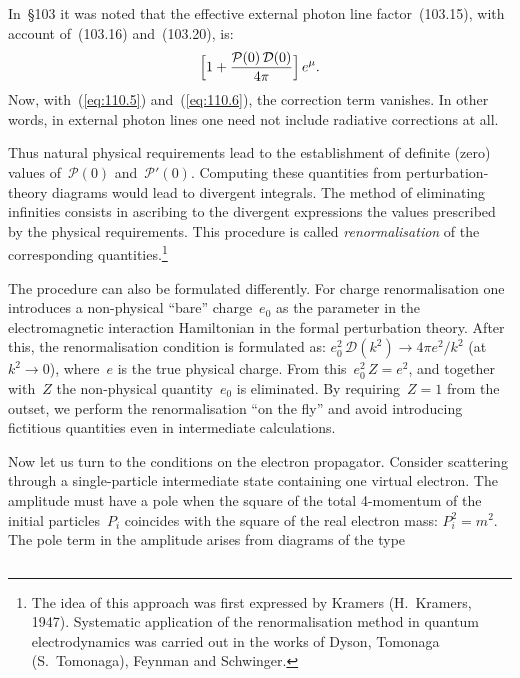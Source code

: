 In~\S103 it was noted that the effective external photon line factor~(103.15), with account of~(103.16) and~(103.20), is:
\[
\Bigl[1 + \frac{\mathcal{P}(0)\,\mathcal{D}(0)}{4\pi}\Bigr]\,e^\mu.
\]
Now, with~(\ref{eq:110.5}) and~(\ref{eq:110.6}), the correction term vanishes. In other words, in external photon lines one need not include radiative corrections at all.

Thus natural physical requirements lead to the establishment of definite (zero) values of~$\mathcal{P}(0)$ and~$\mathcal{P}'(0)$. Computing these quantities from perturbation-theory diagrams would lead to divergent integrals. The method of eliminating infinities consists in ascribing to the divergent expressions the values prescribed by the physical requirements. This procedure is called \emph{renormalisation} of the corresponding quantities.\footnote{The idea of this approach was first expressed by Kramers (H.~Kramers, 1947). Systematic application of the renormalisation method in quantum electrodynamics was carried out in the works of Dyson, Tomonaga (S.~Tomonaga), Feynman and Schwinger.}


The procedure can also be formulated differently. For charge renormalisation one introduces a non-physical ``bare'' charge~$e_0$ as the parameter in the electromagnetic interaction Hamiltonian in the formal perturbation theory. After this, the renormalisation condition is formulated as: $e_0^2\,\mathcal{D}(k^2) \to 4\pi e^2/k^2$ (at~$k^2 \to 0$), where~$e$ is the true physical charge. From this~$e_0^2\,Z = e^2$, and together with~$Z$ the non-physical quantity~$e_0$ is eliminated. By requiring~$Z = 1$ from the outset, we perform the renormalisation ``on the fly'' and avoid introducing fictitious quantities even in intermediate calculations.

Now let us turn to the conditions on the electron propagator. Consider scattering through a single-particle intermediate state containing one virtual electron. The amplitude must have a pole when the square of the total 4-momentum of the initial particles~$P_i$ coincides with the square of the real electron mass: $P_i^2 = m^2$. The pole term in the amplitude arises from diagrams of the type

\begin{equation}
\label{eq:110.8}
\end{equation}

